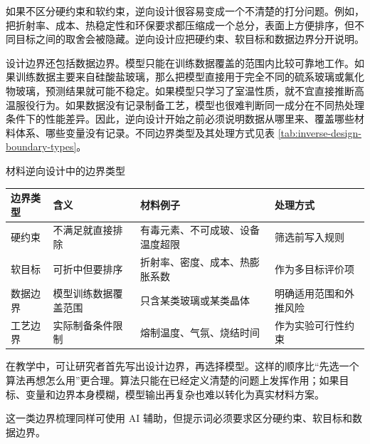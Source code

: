 如果不区分硬约束和软约束，逆向设计很容易变成一个不清楚的打分问题。例如，把折射率、成本、热稳定性和环保要求都压缩成一个总分，表面上方便排序，但不同目标之间的取舍会被隐藏。逆向设计应把硬约束、软目标和数据边界分开说明。

设计边界还包括数据边界。模型只能在训练数据覆盖的范围内比较可靠地工作。如果训练数据主要来自硅酸盐玻璃，那么把模型直接用于完全不同的硫系玻璃或氟化物玻璃，预测结果就可能不稳定。如果模型只学习了室温性质，就不宜直接推断高温服役行为。如果数据没有记录制备工艺，模型也很难判断同一成分在不同热处理条件下的性能差异。因此，逆向设计开始之前必须说明数据从哪里来、覆盖哪些材料体系、哪些变量没有记录。不同边界类型及其处理方式见表 \ref{tab:inverse-design-boundary-types}。

\begin{formalTable}[htbp]
\caption{材料逆向设计中的边界类型}
\label{tab:inverse-design-boundary-types}
\footnotesize
\begin{tabularx}{\textwidth}{@{}YYYY@{}}
\toprule
\textbf{边界类型} & \textbf{含义} & \textbf{材料例子} & \textbf{处理方式} \\
\midrule
硬约束 & 不满足就直接排除 & 有毒元素、不可成玻、设备温度超限 & 筛选前写入规则 \\
软目标 & 可折中但要排序 & 折射率、密度、成本、热膨胀系数 & 作为多目标评价项 \\
数据边界 & 模型训练数据覆盖范围 & 只含某类玻璃或某类晶体 & 明确适用范围和外推风险 \\
工艺边界 & 实际制备条件限制 & 熔制温度、气氛、烧结时间 & 作为实验可行性约束 \\
\bottomrule
\end{tabularx}
\end{formalTable}

在教学中，可让研究者首先写出设计边界，再选择模型。这样的顺序比“先选一个算法再想怎么用”更合理。算法只能在已经定义清楚的问题上发挥作用；如果目标、变量和边界本身模糊，模型输出再复杂也难以转化为真实材料方案。

这一类边界梳理同样可使用 AI 辅助，但提示词必须要求区分硬约束、软目标和数据边界。


